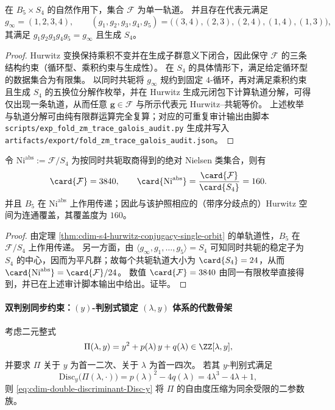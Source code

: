 \begin{theorem}\label{thm:cdim-s4-hurwitz-conjugacy-single-orbit}
在 \(B_5\times S_4\) 的自然作用下，集合 \(\mathcal{F}\) 为单一轨道。
并且存在代表元满足
\[
g_\infty=(1,2,3,4),\qquad
(g_1,g_2,g_3,g_4,g_5)=\bigl((3,4),(2,3),(2,4),(1,4),(1,3)\bigr),
\]
其满足 \(g_1g_2g_3g_4g_5=g_\infty\) 且生成 \(S_4\)。
\end{theorem}
\begin{proof}
Hurwitz 变换保持乘积不变并在生成子群意义下闭合，因此保守 \(\mathcal{F}\) 的三条结构约束（循环型、乘积约束与生成性）。
在 \(S_4\) 的具体情形下，满足给定循环型的数据集合为有限集。
以同时共轭将 \(g_\infty\) 规约到固定 \(4\)-循环，再对满足乘积约束且生成 \(S_4\) 的五换位分解作枚举，并在 Hurwitz 生成元闭包下计算轨道分解，可得仅出现一条轨道，从而任意 \(\mathbf g\in\mathcal{F}\) 与所示代表元 Hurwitz--共轭等价。
上述枚举与轨道分解可由纯有限群运算完全复算；对应的可重复审计输出由脚本 \texttt{scripts/exp\_fold\_zm\_trace\_galois\_audit.py} 生成并写入 \texttt{artifacts/export/fold\_zm\_trace\_galois\_audit.json}。
\end{proof}

\begin{corollary}\label{cor:cdim-s4-abs-nielsen-cardinality-degree}
令 \(\mathrm{Ni}^{\mathrm{abs}}:=\mathcal{F}/S_4\) 为按同时共轭取商得到的绝对 Nielsen 类集合，则有
\[
\card{\mathcal{F}}=3840,
\qquad
\card{\mathrm{Ni}^{\mathrm{abs}}}=\frac{\card{\mathcal{F}}}{\card{S_4}}=160.
\]
并且 \(B_5\) 在 \(\mathrm{Ni}^{\mathrm{abs}}\) 上作用传递；因此与该护照相应的（带序分歧点的）Hurwitz 空间为连通覆盖，其覆盖度为 \(160\)。
\end{corollary}
\begin{proof}
由定理 \ref{thm:cdim-s4-hurwitz-conjugacy-single-orbit} 的单轨道性，\(B_5\) 在 \(\mathcal{F}/S_4\) 上作用传递。
另一方面，由 \(\langle g_\infty,g_1,\dots,g_5\rangle=S_4\) 可知同时共轭的稳定子为 \(S_4\) 的中心，因而为平凡群；故每个共轭轨道大小为 \(\card{S_4}=24\)，从而 \(\card{\mathrm{Ni}^{\mathrm{abs}}}=\card{\mathcal{F}}/24\)。
数值 \(\card{\mathcal{F}}=3840\) 由同一有限枚举直接得到，并已在上述审计脚本输出中给出。证毕。
\end{proof}

\paragraph{双判别同步约束：\texorpdfstring{$(y)$}{y}-判别式锁定 \texorpdfstring{$(\lambda,y)$}{(lambda,y)} 体系的代数骨架}
考虑二元整式
\[
\Pi(\lambda,y)=y^{2}+p(\lambda)\,y+q(\lambda)\in\ZZ[\lambda,y],
\]
并要求 \(\Pi\) 关于 \(y\) 为首一二次、关于 \(\lambda\) 为首一四次。
若其 \(y\)-判别式满足
\begin{equation}\label{eq:cdim-double-discriminant-Disc-y}
\mathrm{Disc}_{y}\bigl(\Pi(\lambda,\cdot)\bigr)
=p(\lambda)^{2}-4q(\lambda)
=4\lambda^{3}-4\lambda+1,
\end{equation}
则 \eqref{eq:cdim-double-discriminant-Disc-y} 将 \(\Pi\) 的自由度压缩为同余受限的二参数族。

